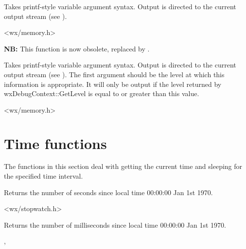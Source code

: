 Takes printf-style variable argument syntax. Output
is directed to the current output stream (see ).


<wx/memory.h>


\label{wxtracelevel}


{\bf NB:} This function is now obsolete, replaced by .

Takes printf-style variable argument syntax. Output
is directed to the current output stream (see ).
The first argument should be the level at which this information is appropriate.
It will only be output if the level returned by wxDebugContext::GetLevel is equal to or greater than
this value.


<wx/memory.h>



\section{Time functions}\label{timefunctions}

The functions in this section deal with getting the current time and sleeping
for the specified time interval.


\label{wxgetlocaltime}


Returns the number of seconds since local time 00:00:00 Jan 1st 1970.




<wx/stopwatch.h>


\label{wxgetlocaltimemillis}


Returns the number of milliseconds since local time 00:00:00 Jan 1st 1970.


,\\


